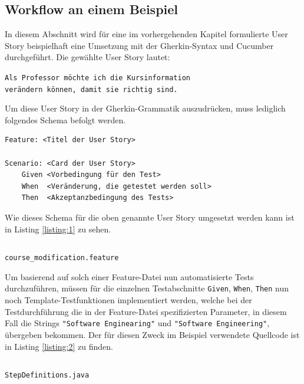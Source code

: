\documentclass[acmtog]{acmart}
\begin{document}
\subsection{Workflow an einem Beispiel}
In diesem Abschnitt wird für eine im vorhergehenden Kapitel formulierte User Story beispielhaft eine Umsetzung
mit der Gherkin-Syntax und Cucumber durchgeführt.
Die gewählte User Story lautet:

\texttt{Als Professor möchte ich die Kursinformation \\verändern können, damit sie richtig sind.}

Um diese User Story in der Gherkin-Grammatik auszudrücken, muss lediglich folgendes Schema befolgt werden.

\vspace*{-.3em}
\begin{verbatim}
Feature: <Titel der User Story>

Scenario: <Card der User Story>
    Given <Vorbedingung für den Test>
    When  <Veränderung, die getestet werden soll>
    Then  <Akzeptanzbedingung des Tests>
\end{verbatim}
\vspace*{-.5em}

Wie dieses Schema für die oben genannte User Story umgesetzt werden kann ist in Listing \ref{listing:1} zu sehen.

\begin{listing}[!ht]
	\inputminted{cucumber}{cucumber/course_modification.feature}
	\caption{\texttt{course\_modification.feature}}
	\label{listing:1}
\end{listing}

Um basierend auf solch einer Feature-Datei nun automatisierte Tests durchzuführen, müssen für die einzelnen Testabschnitte
\texttt{Given}, \texttt{When}, \texttt{Then} nun noch Template-Testfunktionen implementiert werden, welche bei der Testdurchführung
die in der Feature-Datei spezifizierten Parameter, in diesem Fall die Strings \texttt{"Software Enginearing"} und
\texttt{"Software Engineering"}, übergeben bekommen.
Der für diesen Zweck im Beispiel verwendete Quellcode ist in Listing \ref{listing:2} zu finden.

\begin{listing}[!ht]
	\begin{tcolorbox}[colframe=black, colback=white, opacityback=1.0, sharp corners, boxrule=.4pt, width=\linewidth-4pt]
		\inputminted[linenos, firstline=9, breakafter=_, xleftmargin=2pt, numbersep=6pt, frame=none]{java}{cucumber/StepDefinitions.java}
		\vspace{-1em}
	\end{tcolorbox}
	\vspace{-1em}
	\caption{\texttt{StepDefinitions.java}}
	\label{listing:2}
\end{listing}
\end{document}
